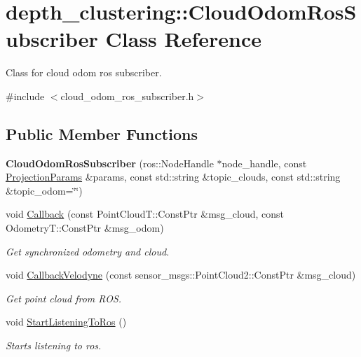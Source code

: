 \hypertarget{classdepth__clustering_1_1CloudOdomRosSubscriber}{\section{depth\-\_\-clustering\-:\-:Cloud\-Odom\-Ros\-Subscriber Class Reference}
\label{classdepth__clustering_1_1CloudOdomRosSubscriber}
}


Class for cloud odom ros subscriber.  




{\ttfamily \#include $<$cloud\-\_\-odom\-\_\-ros\-\_\-subscriber.\-h$>$}

\subsection*{Public Member Functions}
\begin{DoxyCompactItemize}
\item 
\hypertarget{classdepth__clustering_1_1CloudOdomRosSubscriber_a01d66910b5dfe1d1145a8d68645bd7b4}{{\bfseries Cloud\-Odom\-Ros\-Subscriber} (ros\-::\-Node\-Handle $\ast$node\-\_\-handle, const \hyperlink{classdepth__clustering_1_1ProjectionParams}{Projection\-Params} \&params, const std\-::string \&topic\-\_\-clouds, const std\-::string \&topic\-\_\-odom=\char`\"{}\char`\"{})}\label{classdepth__clustering_1_1CloudOdomRosSubscriber_a01d66910b5dfe1d1145a8d68645bd7b4}

\item 
void \hyperlink{classdepth__clustering_1_1CloudOdomRosSubscriber_a76a7474f1deed190ac2fb57084c4cdb9}{Callback} (const Point\-Cloud\-T\-::\-Const\-Ptr \&msg\-\_\-cloud, const Odometry\-T\-::\-Const\-Ptr \&msg\-\_\-odom)
\begin{DoxyCompactList}\small\item\em Get synchronized odometry and cloud. \end{DoxyCompactList}\item 
void \hyperlink{classdepth__clustering_1_1CloudOdomRosSubscriber_a8de806bc0b847229dcc92c504908f019}{Callback\-Velodyne} (const sensor\-\_\-msgs\-::\-Point\-Cloud2\-::\-Const\-Ptr \&msg\-\_\-cloud)
\begin{DoxyCompactList}\small\item\em Get point cloud from R\-O\-S. \end{DoxyCompactList}\item 
\hypertarget{classdepth__clustering_1_1CloudOdomRosSubscriber_a16020c63b14308591cae6f4a9ba9b29a}{void \hyperlink{classdepth__clustering_1_1CloudOdomRosSubscriber_a16020c63b14308591cae6f4a9ba9b29a}{Start\-Listening\-To\-Ros} ()}\label{classdepth__clustering_1_1CloudOdomRosSubscriber_a16020c63b14308591cae6f4a9ba9b29a}

\begin{DoxyCompactList}\small\item\em Starts listening to ros. \end{DoxyCompactList}\end{DoxyCompactItemize}
